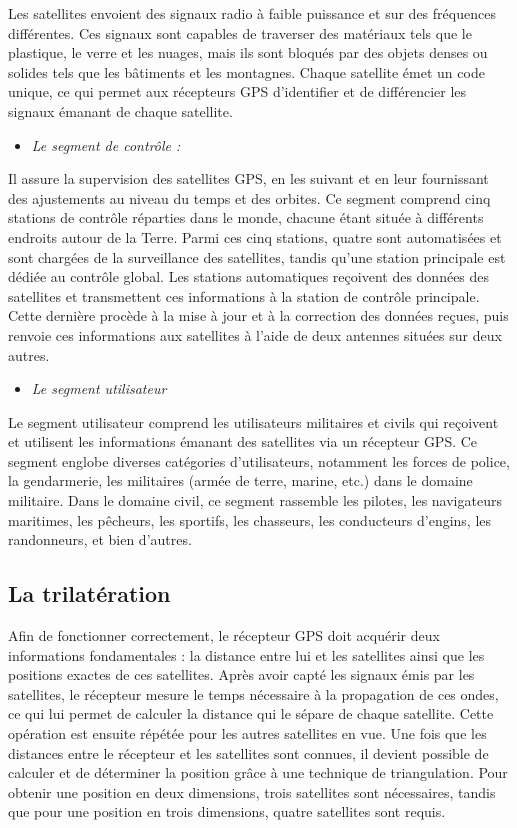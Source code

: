 Les satellites envoient des signaux radio à faible puissance et sur des fréquences différentes. Ces signaux sont capables de traverser des matériaux tels que le plastique, le verre et les nuages, mais ils sont bloqués par des objets denses ou solides tels que les bâtiments et les montagnes. Chaque satellite émet un code unique, ce qui permet aux récepteurs GPS d'identifier et de différencier les signaux émanant de chaque satellite.

\begin{itemize}[label=-]
\item \textit{Le segment de contrôle : }
\end{itemize}

Il assure la supervision des satellites GPS, en les suivant et en leur fournissant des ajustements au niveau du temps et des orbites. Ce segment comprend cinq stations de contrôle réparties dans le monde, chacune étant située à différents endroits autour de la Terre. Parmi ces cinq stations, quatre sont automatisées et sont chargées de la surveillance des satellites, tandis qu'une station principale est dédiée au contrôle global. Les stations automatiques reçoivent des données des satellites et transmettent ces informations à la station de contrôle principale. Cette dernière procède à la mise à jour et à la correction des données reçues, puis renvoie ces informations aux satellites à l'aide de deux antennes situées sur deux autres.

\begin{itemize}[label=-]
	\item \textit{Le segment utilisateur}
\end{itemize}

Le segment utilisateur comprend les utilisateurs militaires et civils qui reçoivent et utilisent les informations émanant des satellites via un récepteur GPS. Ce segment englobe diverses catégories d'utilisateurs, notamment les forces de police, la gendarmerie, les militaires (armée de terre, marine, etc.) dans le domaine militaire. Dans le domaine civil, ce segment rassemble les pilotes, les navigateurs maritimes, les pêcheurs, les sportifs, les chasseurs, les conducteurs d'engins, les randonneurs, et bien d'autres.

\subsection{La trilatération}

Afin de fonctionner correctement, le récepteur GPS doit acquérir deux informations fondamentales : la distance entre lui et les satellites ainsi que les positions exactes de ces satellites. Après avoir capté les signaux émis par les satellites, le récepteur mesure le temps nécessaire à la propagation de ces ondes, ce qui lui permet de calculer la distance qui le sépare de chaque satellite. Cette opération est ensuite répétée pour les autres satellites en vue.
Une fois que les distances entre le récepteur et les satellites sont connues, il devient possible de calculer et de déterminer la position grâce à une technique de triangulation. Pour obtenir une position en deux dimensions, trois satellites sont nécessaires, tandis que pour une position en trois dimensions, quatre satellites sont requis.

